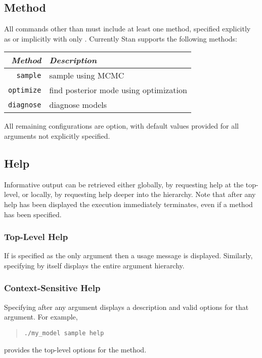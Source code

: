 \subsection{Method}

All commands other than  must include at least one
method, specified explicitly as  or
implicitly with only .  Currently Stan supports
the following methods:
%
\begin{center}
\begin{tabular}{r|l}
{\it Method} & {\it Description} \\ \hline \hline
{\tt sample}   &  sample using MCMC
\\
{\tt optimize} &  find posterior mode using optimization
\\
{\tt diagnose} &  diagnose models
\end{tabular}
\end{center}
%
All remaining configurations are option, with default values
provided for all arguments not explicitly specified.

\subsection{Help}

Informative output can be retrieved either globally, by requesting help
at the top-level, or locally, by requesting help deeper into the hierarchy.
Note that after any help has been displayed the execution immediately
terminates, even if a method has been specified.

\subsubsection{Top-Level Help}

If  is specified as the only argument then a usage message is
displayed.  Similarly, specifying  by itself displays the entire
argument hierarchy.

\subsubsection{Context-Sensitive Help}

Specifying  after any argument displays a description and
valid options for that argument.  For example,
%
\begin{quote}
\begin{Verbatim}[fontshape=sl]
./my_model sample help
\end{Verbatim}
\end{quote}
%
provides the top-level options for the  method.

